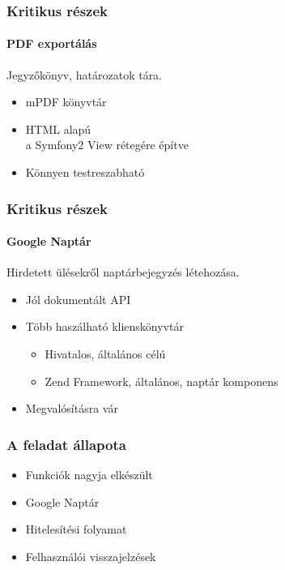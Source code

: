 \documentclass[12pt]{beamer}
\begin{document}
\begin{frame}
    \frametitle{Kritikus részek}
    \framesubtitle{PDF exportálás}
    
    \Large
    Jegyzőkönyv, határozatok tára.
    
    \begin{itemize}
        \item mPDF könyvtár
        \item HTML alapú\\
            \small a Symfony2 View rétegére építve
        \Large
        \item Könnyen testreszabható
    \end{itemize}
\end{frame}

\begin{frame}
    \frametitle{Kritikus részek}
    \framesubtitle{Google Naptár}
    \large
    
    Hirdetett ülésekről naptárbejegyzés létehozása.
    
    \begin{itemize}
        \item Jól dokumentált API
        \item Több haszálható klienskönyvtár\\
        \begin{itemize}
        	\item Hivatalos, általános célú
        	\item Zend Framework, általános, naptár komponens
        \end{itemize}            
        \item Megvalósításra vár
    \end{itemize}
\end{frame}

\begin{frame}
    \frametitle{A feladat állapota}
    
    \Large
    \begin{itemize}
        \item Funkciók nagyja elkészült
        \item Google Naptár
        \item Hitelesítési folyamat
        \item Felhasználói visszajelzések
    \end{itemize}
\end{frame}
\end{document}
